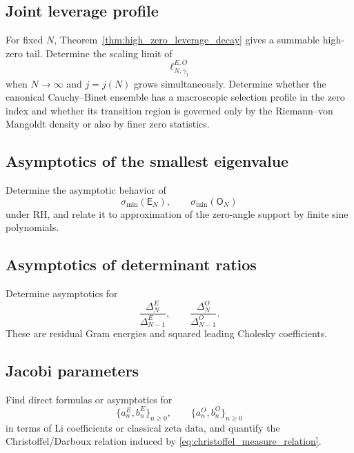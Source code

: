 \documentclass[11pt]{amsart}
\numberwithin{equation}{section}
\theoremstyle{plain}
\theoremstyle{definition}
\theoremstyle{remark}
\newcommand{\RH}{\mathrm{RH}}
\newcommand{\E}{\mathsf E}
\newcommand{\Omat}{\mathsf O}
\begin{document}
\subsection{Joint leverage profile}
\label{ques:joint_leverage_profile}
For fixed $N$, Theorem~\ref{thm:high_zero_leverage_decay} gives a summable high-zero tail.
Determine the scaling limit of
\begin{equation}
 \ell_{N,\gamma_j}^{E,O}
 \label{eq:joint_leverage_question}
\end{equation}
when $N\to\infty$ and $j=j(N)$ grows simultaneously.  Determine whether the canonical
Cauchy--Binet ensemble has a macroscopic selection profile in the zero index and whether
its transition region is governed only by the Riemann--von Mangoldt density or also by
finer zero statistics.

\subsection{Asymptotics of the smallest eigenvalue}
\label{ques:min_eigenvalue}
Determine the asymptotic behavior of
\begin{equation}
 \sigma_{\min}(\E_N),
 \qquad
 \sigma_{\min}(\Omat_N)
 \label{eq:min_eigenvalue_question}
\end{equation}
under $\RH$, and relate it to approximation of the zero-angle support by finite sine
polynomials.

\subsection{Asymptotics of determinant ratios}
\label{ques:determinant_ratios}
Determine asymptotics for
\begin{equation}
 \frac{\Delta_N^E}{\Delta_{N-1}^E},
 \qquad
 \frac{\Delta_N^O}{\Delta_{N-1}^O}.
 \label{eq:determinant_ratio_question}
\end{equation}
These are residual Gram energies and squared leading Cholesky coefficients.

\subsection{Jacobi parameters}
\label{ques:jacobi_parameters}
Find direct formulas or asymptotics for
\begin{equation}
 \{a_n^E,b_n^E\}_{n\ge0},
 \qquad
 \{a_n^O,b_n^O\}_{n\ge0}
 \label{eq:jacobi_parameter_question}
\end{equation}
in terms of Li coefficients or classical zeta data, and quantify the
Christoffel/Darboux relation induced by \eqref{eq:christoffel_measure_relation}.
\end{document}
